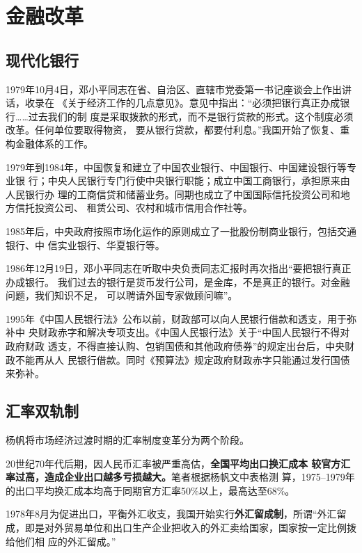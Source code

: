 \section{金融改革}
\label{sec:huilv78}

\subsection{现代化银行}

1979年10月4日，邓小平同志在省、自治区、直辖市党委第一书记座谈会上作出讲话，收录在
《关于经济工作的几点意见》。意见中指出：“必须把银行真正办成银行……过去我们的制
度是采取拨款的形式，而不是银行贷款的形式。这个制度必须改革。任何单位要取得物资，
要从银行贷款，都要付利息。”我国开始了恢复、重构金融体系的工作。

1979年到1984年，中国恢复和建立了中国农业银行、中国银行、中国建设银行等专业银
行；中央人民银行专门行使中央银行职能；成立中国工商银行，承担原来由人民银行办
理的工商信贷和储蓄业务。同期也成立了中国国际信托投资公司和地方信托投资公司、
租赁公司、农村和城市信用合作社等。

1985年后，中央政府按照市场化运作的原则成立了一批股份制商业银行，包括交通银行、中
信实业银行、华夏银行等。

1986年12月19日，邓小平同志在听取中央负责同志汇报时再次指出“要把银行真正办成银行。
我们过去的银行是货币发行公司，是金库，不是真正的银行。对金融问题，我们知识不足，
可以聘请外国专家做顾问嘛”。

1995年《中国人民银行法》公布以前，财政部可以向人民银行借款和透支，用于弥补中
央财政赤字和解决专项支出。《中国人民银行法》关于“中国人民银行不得对政府财政
透支，不得直接认购、包销国债和其他政府债券”的规定出台后，中央财政不能再从人
民银行借款。同时《预算法》规定政府财政赤字只能通过发行国债来弥补。

\subsection{汇率双轨制}

杨帆将市场经济过渡时期的汇率制度变革分为两个阶段。\cite{huilvshi}

20世纪70年代后期，因人民币汇率被严重高估，\textbf{全国平均出口换汇成本
  较官方汇率过高，造成企业出口越多亏损越大。}笔者根据杨帆文中表格测
算，1975--1979年的出口平均换汇成本均高于同期官方汇率50\%以上，最高达至68\%。

1978年8月为促进出口，平衡外汇收支，我国开始实行\textbf{外汇留成制}，所谓“外汇留
成，即是对外贸易单位和出口生产企业把收入的外汇卖给国家，国家按一定比例拨给他们相
应的外汇留成。”

